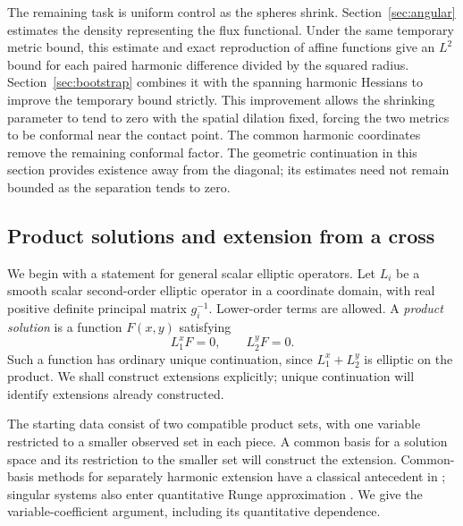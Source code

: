 The remaining task is uniform control as the spheres shrink.
Section~\ref{sec:angular} estimates the density representing the flux
functional. Under the same temporary metric bound, this estimate and exact
reproduction of affine functions give an $L^2$ bound for each paired
harmonic difference divided by the squared radius.
Section~\ref{sec:bootstrap} combines it with the spanning harmonic
Hessians to improve the temporary bound strictly. This improvement
allows the shrinking parameter to tend to zero with the spatial dilation
fixed, forcing the two metrics to be conformal near the contact point.
The common harmonic coordinates remove the remaining conformal factor. The geometric
continuation in this section provides existence away from the diagonal;
its estimates need not remain bounded as the separation tends to zero.

\subsection{Product solutions and extension from a cross}

We begin with a statement for general scalar elliptic operators. Let
$L_i$ be a smooth scalar second-order elliptic operator in a coordinate
domain, with real positive definite principal matrix $g_i^{-1}$.
Lower-order terms are allowed. A \emph{product solution} is a function
$F(x,y)$ satisfying
\[
 L_1^xF=0,\qquad L_2^yF=0.
\]
Such a function has ordinary unique continuation, since $L_1^x+L_2^y$
is elliptic on the product. We shall construct extensions explicitly;
unique continuation will identify extensions already constructed.

The starting data consist of two compatible product sets, with one
variable restricted to a smaller observed set in each piece. A common
basis for a solution space and its restriction to the smaller set will
construct the extension. Common-basis methods for separately harmonic
extension have a classical antecedent in \citet{Zeriahi1982}; singular
systems also enter quantitative Runge approximation
\cite{RulandSalo2019}. We give the variable-coefficient argument,
including its quantitative dependence.

